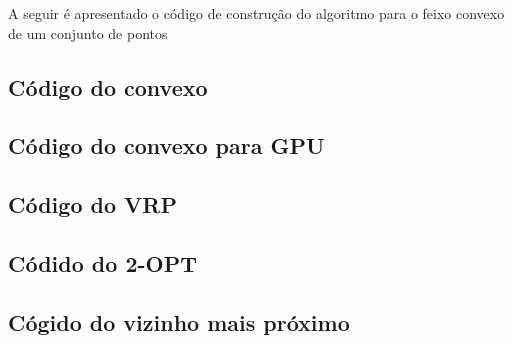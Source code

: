 \documentclass[a4paper, 12pt]{article}
\begin{document}
	A seguir é apresentado o código de construção do algoritmo para o feixo
convexo de um conjunto de pontos 

\subsection{Código do convexo}
{\small

}
\subsection{Código do convexo para GPU}

\subsection{Código do VRP}
{\small

}
\subsection{Códido do 2-OPT}
{\small

}

\subsection{Cógido do vizinho mais próximo}
\end{document}
